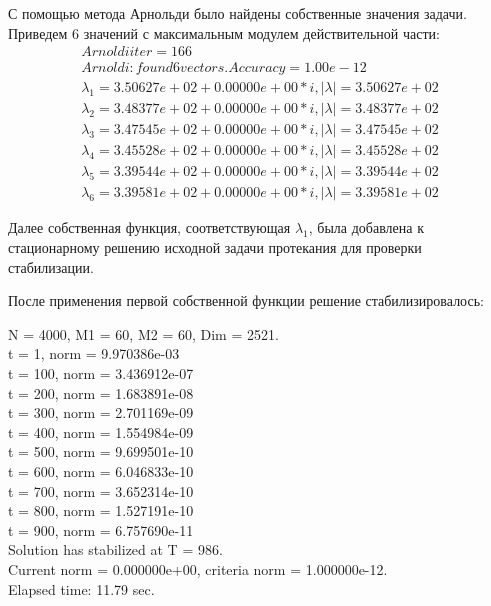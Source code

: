 \documentclass[12pt,a4paper]{article}
\begin{document}
С помощью метода Арнольди было найдены собственные значения задачи. Приведем 6 значений с  максимальным модулем действительной части:
\begin{eqnarray*}
	Arnoldi iter =  166                                                 \\
	Arnoldi: found 6 vectors. Accuracy = 1.00e-12                       \\
	\lambda_1 = 3.50627e+02 + 0.00000e+00 * i, |\lambda| = 3.50627e+02  \\
	\lambda_2 = 3.48377e+02 + 0.00000e+00 * i, |\lambda| = 3.48377e+02  \\
	\lambda_3 = 3.47545e+02 + 0.00000e+00 * i, |\lambda| = 3.47545e+02  \\
	\lambda_4 = 3.45528e+02 + 0.00000e+00 * i, |\lambda| = 3.45528e+02  \\
	\lambda_5 = 3.39544e+02 + 0.00000e+00 * i, |\lambda| = 3.39544e+02  \\
	\lambda_6 = 3.39581e+02 + 0.00000e+00 * i, |\lambda| = 3.39581e+02
\end{eqnarray*}

Далее собственная функция, соответствующая $\lambda_1$, была добавлена к стационарному решению исходной задачи протекания для проверки стабилизации.

После применения первой собственной функции решение стабилизировалось:
\begin{center}
N = 4000, M1 =  60, M2 =  60, Dim =   2521.                  \\
t =   1, norm = 9.970386e-03                                 \\
t = 100, norm = 3.436912e-07                                 \\
t = 200, norm = 1.683891e-08                                 \\
t = 300, norm = 2.701169e-09                                 \\
t = 400, norm = 1.554984e-09                                 \\
t = 500, norm = 9.699501e-10                                 \\
t = 600, norm = 6.046833e-10                                 \\
t = 700, norm = 3.652314e-10                                 \\
t = 800, norm = 1.527191e-10                                 \\
t = 900, norm = 6.757690e-11                                 \\
Solution has stabilized at T = 986.                          \\
Current norm = 0.000000e+00, criteria norm = 1.000000e-12.   \\
Elapsed time: 11.79 sec.
\end{center}
\end{document}
